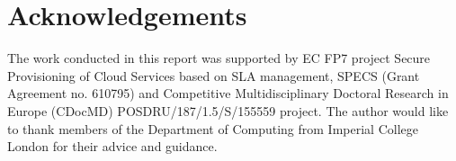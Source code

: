 \section*{Acknowledgements}

The work conducted in this report was supported by EC FP7 project Secure Provisioning of Cloud Services based on SLA management, SPECS (Grant Agreement no. 610795) and Competitive Multidisciplinary Doctoral Research in Europe (CDocMD) POSDRU/187/1.5/S/155559 project. The author would like to thank members of the Department of Computing from Imperial College London for their advice and guidance.